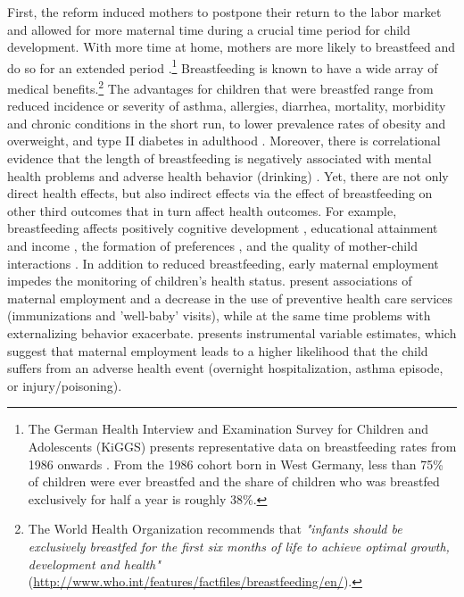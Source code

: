 \documentclass[11pt, a4paper]{article} %
\begin{document}
First, the reform induced mothers to postpone their return to the labor market and allowed for more maternal time during a crucial time period for child development. With more time at home, mothers are more likely to breastfeed and do so for an extended period \citep{baker2008maternal,berger2005earlymaternal}.\footnote{The German Health Interview and Examination Survey for Children and Adolescents (KiGGS) presents representative data on breastfeeding rates from 1986 onwards \citep{lange2007breastfeeding}. From the 1986 cohort born in West Germany, less than 75\% of children were ever breastfed and the share of children who was breastfed exclusively for half a year is roughly 38\%.} Breastfeeding is known to have a wide array of medical benefits.\footnote{The World Health Organization recommends that \textit{"infants should be exclusively breastfed for the first six months of life to achieve optimal growth, development and health"} (\href{http://www.who.int/features/factfiles/breastfeeding/en/}{http://www.who.int/features/factfiles/breastfeeding/en/}).} The advantages for children that were breastfed range from reduced incidence or severity of asthma, allergies, diarrhea, mortality, morbidity and chronic conditions in the short run, to lower prevalence rates of obesity and overweight, and type II diabetes in adulthood \citep{ruhm2000parental, victora2016breastfeeding}. Moreover, there is correlational evidence that the length of breastfeeding is negatively associated with mental health problems and adverse health behavior (drinking) \citep{oddy2010longterm,falk2016early}. Yet, there are not only direct health effects, but also indirect effects via the effect of breastfeeding on other third outcomes that in turn affect health outcomes. For example, breastfeeding affects positively cognitive development \citep{albagli2018}, educational attainment and income \citep{victoria2015association}, the formation of preferences \citep{falk2016early}, and the quality of mother-child interactions \citep{papp2014longitudinal}. \newline 
In addition to reduced breastfeeding, early maternal employment impedes the monitoring of children's health status. \cite{berger2005earlymaternal} present associations of maternal employment and a decrease in the use of preventive health care services (immunizations and 'well-baby' visits), while at the same time problems with externalizing behavior exacerbate. \cite{morrill2011} presents instrumental variable estimates, which suggest that maternal employment leads to a higher likelihood that the child suffers from an adverse health event (overnight hospitalization, asthma episode, or injury/poisoning).\newline 
\end{document}
